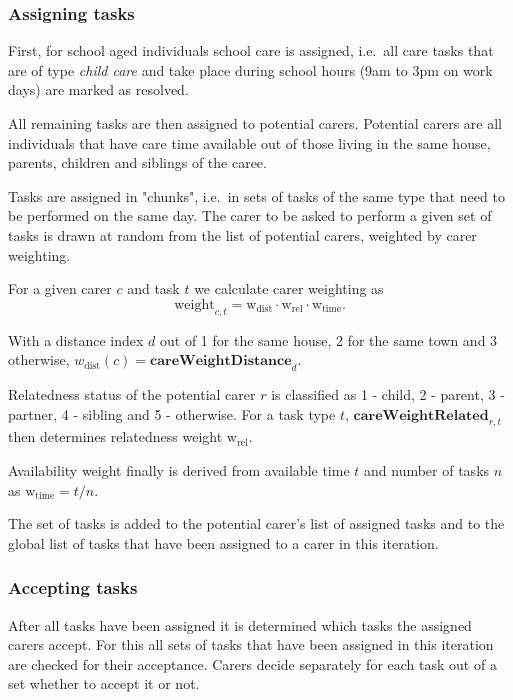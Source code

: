 \documentclass{article}
\begin{document}
\subsubsection*{Assigning tasks}

First, for school aged individuals school care is assigned, i.e.~all care tasks that are of type \emph{child care} and take place during school hours (9am to 3pm on work days) are marked as resolved.

All remaining tasks are then assigned to potential carers. Potential carers are all individuals that have care time available out of those living in the same house, parents, children and siblings of the caree.

Tasks are assigned in "chunks", i.e.~in sets of tasks of the same type that need to be performed on the same day. The carer to be asked to perform a given set of tasks is drawn at random from the list of potential carers, weighted by carer weighting.

For a given carer $c$ and task $t$ we calculate carer weighting as
\[
\textrm{weight}_{c,t} = \textrm{w}_\textrm{dist} \cdot \textrm{w}_\textrm{rel} \cdot \textrm{w}_\textrm{time}.
\]

With a distance index $d$ out of 1 for the same house, 2 for the same town and 3 otherwise, $w_\textrm{dist}(c) = \textbf{careWeightDistance}_d$. 

Relatedness status of the potential carer $r$ is classified as 1 - child, 2 - parent, 3 - partner, 4 - sibling and 5 - otherwise. For a task type $t$, $\textbf{careWeightRelated}_{r,t}$ then determines relatedness weight $\textrm{w}_\textrm{rel}$.

Availability weight finally is derived from available time $t$ and number of tasks $n$ as $\textrm{w}_\textrm{time} = t/n$.

The set of tasks is added to the potential carer's list of assigned tasks and to the global list of tasks that have been assigned to a carer in this iteration.


\subsubsection*{Accepting tasks}

After all tasks have been assigned it is determined which tasks the assigned carers accept. For this all sets of tasks that have been assigned in this iteration are checked for their acceptance. Carers decide separately for each task out of a set whether to accept it or not. 
\end{document}
